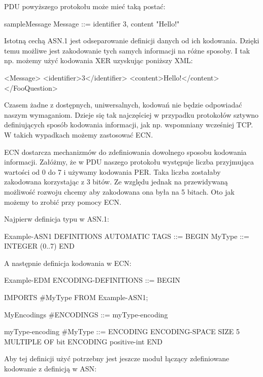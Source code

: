 \documentclass[00-praca-magisterska.tex]{subfiles}
\begin{document}
PDU powyższego protokołu może mieć taką postać:

\begin{textcode}
  sampleMessage Message ::= {
      identifier     3,
      content        "Hello!"
  }
\end{textcode}

Istotną cechą ASN.1 jest odseparowanie definicji danych od ich kodowania.
Dzięki temu możliwe jest zakodowanie tych samych informacji na różne sposoby. I
tak np. możemy użyć kodowania XER uzyskując poniższy XML:

\begin{xmlcode}
  <Message>
      <identifier>3</identifier>
      <content>Hello!</content>
  </FooQuestion>
\end{xmlcode}

Czasem żadne z dostępnych, uniwersalnych, kodowań nie będzie odpowiadać naszym
wymaganiom. Dzieje się tak najczęściej w przypadku protokołów sztywno
definiujących sposób kodowania informacji, jak np. wspomniany wcześniej TCP. W
takich wypadkach możemy zastosować ECN.

ECN dostarcza mechanizmów do zdefiniowania dowolnego sposobu kodowania
informacji. Załóżmy, że w PDU naszego protokołu występuje liczba przyjmująca
wartości od 0 do 7 i używamy kodowania PER. Taka liczba zostałaby zakodowana
korzystając z 3 bitów. Ze względu jednak na przewidywaną możliwość rozwoju
chcemy aby zakodowana ona była na 5 bitach. Oto jak możemy to zrobić przy
pomocy ECN.

Najpierw definicja typu w ASN.1:

\begin{textcode}
  Example-ASN1 DEFINITIONS AUTOMATIC TAGS ::=
  BEGIN
    MyType ::= INTEGER (0..7)
  END
\end{textcode}

A następnie definicja kodowania w ECN:

\begin{textcode}
  Example-EDM ENCODING-DEFINITIONS ::=
  BEGIN
  
  IMPORTS
    #MyType
  FROM Example-ASN1;
  
  MyEncodings #ENCODINGS ::= { myType-encoding }
  
  myType-encoding #MyType ::= {
    ENCODING {
      ENCODING-SPACE
      SIZE 5
      MULTIPLE OF bit
      ENCODING positive-int
    }
  }
  END
\end{textcode}

Aby tej definicji użyć potrzebny jest jeszcze moduł łączący zdefiniowane kodowanie z definicją w ASN:
\end{document}
